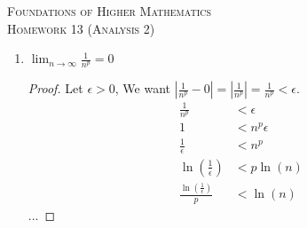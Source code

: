 \documentclass{article}
\theoremstyle{problem}
\theoremstyle{plain}
\theoremstyle{remark}
\newcommand{\abs}[1] {
  \left| #1 \right|
}
\newcommand{\myln}[1] {
  \ln{\left( #1 \right)}
}
\begin{document}
\begin{center}
  \textsc{\Large Foundations of Higher Mathematics}\\[.3cm]
  \textsc{\Large Homework 13 (Analysis 2)}
\end{center}

\begin{enumerate}
\item %
  $\displaystyle \lim_{n \to \infty} \frac{1}{n^p} = 0$
  \begin{proof}
    Let $\epsilon > 0$,
    We want $\abs{\frac{1}{n^p} - 0} = \abs{\frac{1}{n^p}} = \frac{1}{n^p} < \epsilon$.
    \begin{align*}
      \frac{1}{n^p} &< \epsilon\\
      1 &< n^p \epsilon\\
      \frac{1}{\epsilon} &< n^p\\
      \myln{\frac{1}{\epsilon}} &< p \myln{n}\\
      \frac{\myln{\frac{1}{\epsilon}}}{p} &< \myln{n}
    \end{align*}
    ...

  \end{proof}


\end{enumerate}
\end{document}
